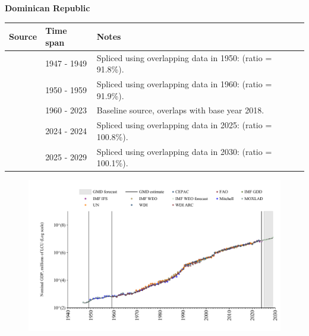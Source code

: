 \documentclass[12pt,a4paper,landscape]{article}
\begin{document}
\begin{adjustbox}{max totalsize={\paperwidth}{\paperheight},center}
\begin{minipage}[t][\textheight][t]{\textwidth}
\vspace*{0.5cm}
{}
\begin{center}
{\Large\bfseries Dominican Republic}
\end{center}
\vspace{0.5cm}
\begin{table}[H]
\centering
\small
\begin{tabular}{|l|l|l|}
\hline
\textbf{Source} & \textbf{Time span} & \textbf{Notes} \\
\hline
\rowcolor{white}\cite{MOXLAD}& 1947 - 1949 &Spliced using overlapping data in 1950: (ratio = 91.8\%).\\
\rowcolor{lightgray}\cite{Mitchell}& 1950 - 1959 &Spliced using overlapping data in 1960: (ratio = 91.9\%).\\
\rowcolor{white}\cite{WDI}& 1960 - 2023 &Baseline source, overlaps with base year 2018.\\
\rowcolor{lightgray}\cite{IMF_IFS}& 2024 - 2024 &Spliced using overlapping data in 2025: (ratio = 100.8\%).\\
\rowcolor{white}\cite{IMF_WEO_forecast}& 2025 - 2029 &Spliced using overlapping data in 2030: (ratio = 100.1\%).\\
\hline
\end{tabular}
\end{table}
\begin{figure}[H]
\centering
\includegraphics[width=\textwidth,height=0.6\textheight,keepaspectratio]{graphs/DOM_nGDP.pdf}
\end{figure}
\end{minipage}
\end{adjustbox}
\end{document}
